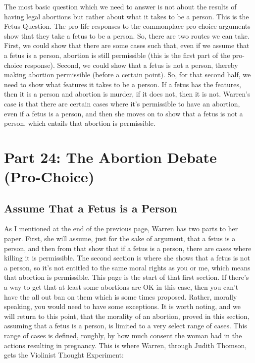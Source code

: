 The most basic question which we need to answer is not about the results of having legal abortions but rather about what it takes to be a person. This is the Fetus Question. The pro-life responses to the commonplace pro-choice arguments show that they take a fetus to be a person. So, there are two routes we can take. First, we could show that there are some cases such that, even if we assume that a fetus is a person, abortion is still permissible (this is the first part of the pro-choice response). Second, we could show that a fetus is not a person, thereby making abortion permissible (before a certain point). So, for that second half, we need to show what features it takes to be a person. If a fetus has the features, then it is a person and abortion is murder, if it does not, then it is not. Warren's case is that there are certain cases where it's permissible to have an abortion, even if a fetus is a person, and then she moves on to show that a fetus is not a person, which entails that abortion is permissible.

\chapter{Part 24: The Abortion Debate (Pro-Choice)}
\section{Assume That a Fetus is a Person}
As I mentioned at the end of the previous page, Warren has two parts to her paper. First, she will assume, just for the sake of argument, that a fetus is a person, and then from that show that if a fetus is a person, there are cases where killing it is permissible. The second section is where she shows that a fetus is not a person, so it's not entitled to the same moral rights as you or me, which means that abortion is permissible. This page is the start of that first section. If there's a way to get that at least some abortions are OK in this case, then you can't have the all out ban on them which is some times proposed. Rather, morally speaking, you would need to have some exceptions. It is worth noting, and we will return to this point, that the morality of an abortion, proved in this section, assuming that a fetus is a person, is limited to a very select range of cases. This range of cases is defined, roughly, by how much consent the woman had in the actions resulting in pregnancy.  This is where Warren, through Judith Thomson, gets the Violinist Thought Experiment:\autocite{Thomson1}

